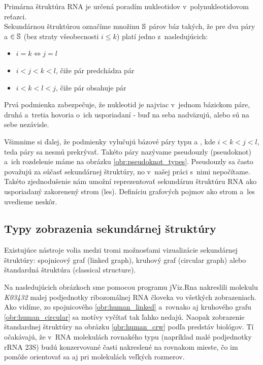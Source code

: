 \begin{definice}
  \label{def:RNA_sekundarna_struktura}
  Primárna štruktúra RNA je určená poradím nukleotidov v~polynukleotidovom reťazci.
  \\
  Sekundárnou štruktúrou označíme množinu $\mathbb{S}$ párov báz  takých,
  že pre dva páry  a  $\in \mathbb{S}$ (bez straty všeobecnosti $i \leq k$)
  platí jedno z~nasledujúcich:
  \begin{itemize}
    \item $i = k \iff j = l$
    \item $i < j < k < l$, čiže pár  predchádza pár 
    \item $i < k < l < j$, čiže pár  obsahuje pár 
  \end{itemize}
\end{definice}

Prvá podmienka zabezpečuje, že nukleotid je najviac v~jednom bázickom páre,
druhá a~tretia hovoria o~ich usporiadaní - buď na seba nadväzujú, alebo
sú na sebe nezávisle.

Všimnime si ďalej, že podmienky vylučujú bázové páry typu  a ,
kde \mbox{$i < k < j < l$}, teda páry sa nesmú prekrývať. Takéto páry nazývame
pseudouzly (pseudoknot) a~ich rozdelenie máme na obrázku \ref{obr:pseudoknot_types}.
Pseudouzly sa často považujú za súčasť sekundárnej štruktúry, no v~našej práci
s~nimi nepočítame. Takéto zjednodušenie nám umožní reprezentovať sekundárnu
štruktúru RNA ako usporiadaný zakorenený strom (les). Definíciu grafových
pojmov ako strom a~les uvedieme neskôr.





\subsection{Typy zobrazenia sekundárnej štruktúry}

Existujúce nástroje volia medzi tromi možnosťami vizualizácie sekundárnej
štruktúry: spojnicový graf (linked graph), kruhový graf (circular graph)
alebo štandardná štruktúra (classical structure).

Na nasledujúcich obrázkoch sme pomocou programu jViz.Rna 
nakreslili molekulu \textit{K03432} malej podjednotky ribozomálnej RNA človeka
vo všetkých zobrazeniach.
Ako vidíme, zo spojnicového \ref{obr:human_linked} a~rovnako aj kruhového
grafu \ref{obr:human_circular} sa motívy vyčítať tak ľahko nedajú.
Naopak zobrazenie štandardnej štruktúry na obrázku \ref{obr:human_crw}
podľa predstáv biológov.
Tí očakávajú, že v~RNA molekulách rovnakého typu (napríklad malé podjednotky rRNA 23S)
budú konzervované časti nakreslené na rovnakom mieste, čo im pomôže orientovať sa
aj pri molekulách veľkých rozmerov.


